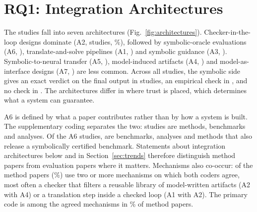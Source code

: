 \section{RQ1: Integration Architectures}
\label{sec:taxonomy}



The  studies fall into seven architectures (Fig.~\ref{fig:architectures}). Checker-in-the-loop designs dominate (A2,  studies, \%), followed by symbolic-oracle evaluations (A6, ), translate-and-solve pipelines (A1, ) and symbolic guidance (A3, ). Symbolic-to-neural transfer (A5, ), model-induced artifacts (A4, ) and model-as-interface designs (A7, ) are less common. Across all studies, the symbolic side gives an exact verdict on the final output in  studies, an empirical check in , and no check in . The architectures differ in where trust is placed, which determines what a system can guarantee.

A6 is defined by what a paper contributes rather than by how a system is built. The supplementary coding separates the two:  studies are methods,  benchmarks and  analyses. Of the  A6 studies,  are benchmarks,  analyses and  methods that also release a symbolically certified benchmark. Statements about integration architectures below and in Section~\ref{sec:trends} therefore distinguish method papers from evaluation papers where it matters. Mechanisms also co-occur:  of the  method papers (\%) use two or more mechanisms on which both coders agree, most often a checker that filters a reusable library of model-written artifacts (A2 with A4) or a translation step inside a checked loop (A1 with A2). The primary code is among the agreed mechanisms in \% of method papers.


